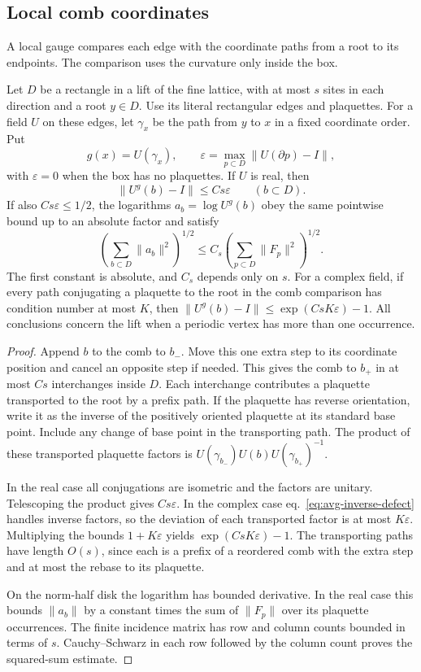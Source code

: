 \documentclass[11pt,letterpaper,reqno]{amsart}
\makeatletter
\numberwithin{equation}{section}
\renewcommand{\eqref}[1]{\textup{eq.~\ref{#1}}}
\theoremstyle{definition}
\newcommand{\ms@minorstart}{%
  \pushQED{\qed}\renewcommand{\qedsymbol}{$\blacksquare$}}
\newenvironment{lemma}[1][]{\ms@minorstart\ms@lemma[#1]}
  {\popQED\endms@lemma}
\theoremstyle{remark}
\makeatother
\begin{document}
\subsection{Local comb coordinates}

A local gauge compares each edge with the coordinate paths from
a root to its endpoints. The comparison uses the curvature only
inside the box.

\begin{lemma}[Comb estimate on a box]\label{lem:avg-comb}
Let \(D\) be a rectangle in a lift of the fine lattice, with
at most \(s\) sites in each direction and a root \(y\in D\).
Use its literal rectangular edges and plaquettes. For a field
\(U\) on these edges, let \(\gamma_x\) be the path from \(y\)
to \(x\) in a fixed coordinate order. Put
\[
 g(x)=U(\gamma_x),\qquad
 \varepsilon=\max_{p\subset D}\|U(\partial p)-I\|,
\]
with \(\varepsilon=0\) when the box has no plaquettes.
If \(U\) is real, then
\[
 \|U^g(b)-I\|\le C s\varepsilon\qquad (b\subset D).
\]
If also \(C s\varepsilon\le1/2\), the logarithms
\(a_b=\log U^g(b)\) obey the same pointwise bound up to an
absolute factor and satisfy
\[
 \left(\sum_{b\subset D}\|a_b\|^2\right)^{1/2}
 \le C_s\left(\sum_{p\subset D}\|F_p\|^2\right)^{1/2}.
\]
The first constant is absolute, and \(C_s\) depends only on \(s\).
For a complex field, if every path conjugating a plaquette to
the root in the comb comparison has condition number at most
\(K\), then
\(\|U^g(b)-I\|\le \exp(C sK\varepsilon)-1\).
All conclusions concern the lift when a periodic vertex has
more than one occurrence.
\end{lemma}

\begin{proof}
Append \(b\) to the comb to \(b_-\). Move this one extra step
to its coordinate position and cancel an opposite step if
needed. This gives the comb to \(b_+\) in at most \(Cs\)
interchanges inside \(D\). Each interchange contributes a
plaquette transported to the root by a prefix path. If the
plaquette has reverse orientation, write it as the inverse
of the positively oriented plaquette at its standard base
point. Include any change of base point in the transporting
path. The product of these transported plaquette factors is
\(U(\gamma_{b_-})U(b)U(\gamma_{b_+})^{-1}\).

In the real case all conjugations are isometric and the factors
are unitary. Telescoping the product gives \(Cs\varepsilon\).
In the complex case \eqref{eq:avg-inverse-defect} handles
inverse factors, so the deviation of each transported factor
is at most \(K\varepsilon\). Multiplying the bounds
\(1+K\varepsilon\) yields \(\exp(CsK\varepsilon)-1\).
The transporting paths have length \(O(s)\), since each is a
prefix of a reordered comb with the extra step and at most
the rebase to its plaquette.

On the norm-half disk the logarithm has bounded derivative.
In the real case this bounds \(\|a_b\|\) by a constant times
the sum of \(\|F_p\|\) over its plaquette occurrences. The
finite incidence matrix has row and column counts bounded
in terms of \(s\). Cauchy--Schwarz in each row followed by
the column count proves the squared-sum estimate.
\end{proof}
\end{document}
